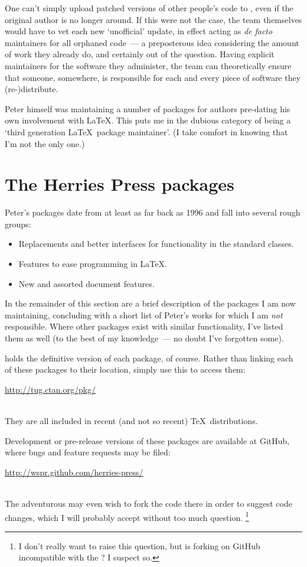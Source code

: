 \documentclass{ltugboat}
\begin{document}
One can't simply upload patched versions of other people's code to , even if the original author is no longer around. If this were not the case, the  team themselves would have to vet each new `unofficial' update, in effect acting as \emph{de facto} maintainers for all orphaned code~--- a preposterous idea considering the amount of work they already do, and certainly out of the question. Having explicit maintainers for the software they administer, the  team can theoretically ensure that someone, somewhere, is responsible for each and every piece of software they (re-)distribute.

Peter himself was maintaining a number of packages for authors pre-dating his own involvement with \LaTeX. This puts me in the dubious category of being a `third generation \LaTeX\ package maintainer'. (I take comfort in knowing that I'm not the only one.)

\section{The Herries Press packages}

Peter's packages date from at least as far back as 1996 and fall into several rough groups:
\begin{itemize}
\item Replacements and better interfaces for functionality in the standard classes.
\item Features to ease programming in \LaTeX.
\item New and assorted document features.
\end{itemize}
In the remainder of this section are a brief description of the packages I am now maintaining, concluding with a short list of Peter's works for which I am \emph{not} responsible. Where other packages exist with similar functionality, I've listed them as well (to the best of my knowledge~--- no doubt I've forgotten some).

 holds the definitive version of each package, of course. Rather than linking each of these packages to their  location, simply use this  to access them:\\
\centerline{\url{http://tug.ctan.org/pkg/}}\\
They are all included in recent (and not so recent) \TeX\ distributions.

Development or pre-release versions of these packages are available at GitHub, where bugs and feature requests may be filed:\\
\centerline{\url{http://wspr.github.com/herries-press/}}\\
The adventurous may even wish to fork the code there in order to suggest code changes, which I will probably accept without too much question.%
\footnote{I don't really want to raise this question, but is forking on GitHub incompatible with the ? I suspect so.}
\end{document}

